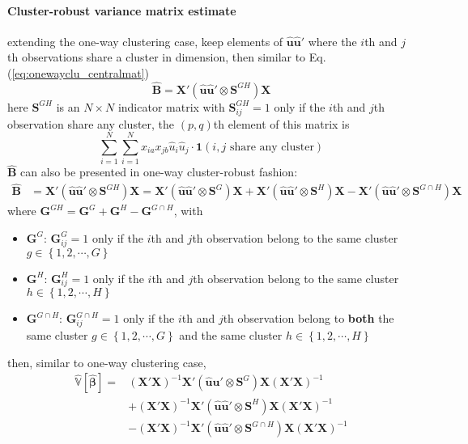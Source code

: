 \documentclass[twoside]{article}
\begin{document}
\paragraph*{Cluster-robust variance matrix estimate} extending the one-way clustering case, keep elements of $\hat{\mathbf{u}}\hat{\mathbf{u}}'$ where the $i$th and $j$th observations share a cluster in  dimension, then similar to Eq.(\ref{eq:onewayclu_centralmat})
\begin{equation}\label{eq:twowayclu_centermat}
    \hat{\mathbf{B}} = \mathbf{X}'\left(\hat{\mathbf{u}}\hat{\mathbf{u}}' \otimes \mathbf{S}^{GH}\right)\mathbf{X}
\end{equation}
here $\mathbf{S}^{GH}$ is an $N\times N$ indicator matrix with $\mathbf{S}^{GH}_{ij}=1$ only if the $i$th and $j$th observation share any cluster, the $(p,q)$th element of this matrix is 
$$
\sum^N_{i=1}\sum^N_{i=1}x_{ia}x_{jb}\hat{u}_i\hat{u}_j \cdot \mathbf{1} \left(i,j\text{ share any cluster}\right)
$$
$\hat{\mathbf{B}}$ can also be presented in one-way cluster-robust fashion:
\begin{align}\label{eq:twowayclu_centmat}
    \hat{\mathbf{B}} &= \mathbf{X}'\left( \hat{\mathbf{u}}\hat{\mathbf{u}}' \otimes \mathbf{S}^{GH} \right)\mathbf{X} = \mathbf{X}'\left( \hat{\mathbf{u}}\hat{\mathbf{u}}' \otimes \mathbf{S}^G \right)\mathbf{X} + \mathbf{X}'\left( \hat{\mathbf{u}}\hat{\mathbf{u}}' \otimes \mathbf{S}^H \right)\mathbf{X} - \mathbf{X}'\left( \hat{\mathbf{u}}\hat{\mathbf{u}}' \otimes \mathbf{S}^{G\cap H} \right)\mathbf{X}
\end{align}
where $\mathbf{G}^{GH} =\mathbf{G}^G+ \mathbf{G}^H - \mathbf{G}^{G\cap H} $, with 
\begin{itemize}
    \item $\mathbf{G}^G$: $\mathbf{G}^G_{ij}=1$ only if the $i$th and $j$th observation belong to the same cluster $g\in \left\{1,2,\cdots,G\right\}$
    \item $\mathbf{G}^H$: $\mathbf{G}^H_{ij}=1$ only if the $i$th and $j$th observation belong to the same cluster $h\in \left\{1,2,\cdots,H\right\}$
    \item $\mathbf{G}^{G\cap H}$: $\mathbf{G}^{G\cap H}_{ij}=1$ only if the $i$th and $j$th observation belong to \textbf{both} the same cluster $g\in \left\{1,2,\cdots,G\right\}$ and the same cluster $h\in \left\{1,2,\cdots,H\right\}$
\end{itemize}
then, similar to one-way clustering case,
\begin{align}
    \hat{\mathbb{V}}\left[\hat{\boldsymbol{\beta}}\right] =& \left(\mathbf{X'X}\right)^{-1}\mathbf{X}'\left(\hat{\mathbf{u}}\hat{\mathbf{u}}'\otimes \mathbf{S}^G\right)\mathbf{X}\left(\mathbf{X'X}\right)^{-1} \\ \nonumber
    &+ \left(\mathbf{X'X}\right)^{-1}\mathbf{X}'\left(\hat{\mathbf{u}}\hat{\mathbf{u}}'\otimes \mathbf{S}^H\right)\mathbf{X}\left(\mathbf{X'X}\right)^{-1} \\ \nonumber
    &- \left(\mathbf{X'X}\right)^{-1}\mathbf{X}'\left(\hat{\mathbf{u}}\hat{\mathbf{u}}'\otimes \mathbf{S}^{G\cap H}\right)\mathbf{X}\left(\mathbf{X'X}\right)^{-1}
\end{align}
\end{document}
